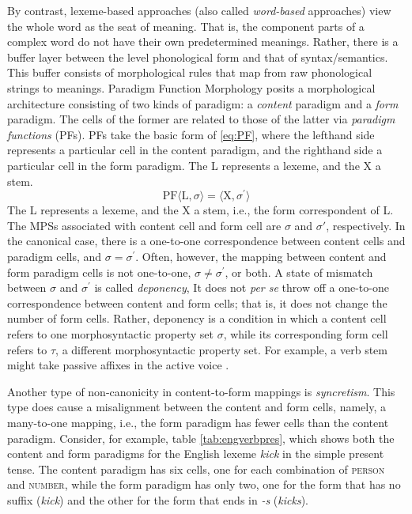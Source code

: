 By contrast, lexeme-based approaches (also called \emph{word-based} 
approaches) view the whole word as the seat of meaning. That is, the component 
parts of a complex word do not have their own predetermined meanings. 
Rather, 
there is a buffer layer between the level phonological form and that of 
syntax/semantics. This
buffer consists of morphological rules that map from raw phonological 
strings to meanings.
Paradigm Function Morphology \cite{stump:2001} 
posits a morphological architecture consisting of two kinds of paradigm: a \emph{content} paradigm and a \emph{form} paradigm.
The cells of the former are related to those of the latter via
\emph{paradigm functions} (PFs).
PFs take the basic form of
\eqref{eq:PF}, where the lefthand side represents a particular cell in the content paradigm, and the righthand side a particular cell in the form paradigm. The L represents a lexeme, and the X a stem. 
\begin{equation}
\label{eq:PF}
	\text{PF}\langle \text{L},\sigma \rangle = \langle \text{X}, \sigma^\prime \rangle
\end{equation}
The L represents a lexeme, and the X a stem,  i.e., the form correspondent of L. 
The \ac{MPS}s associated with content cell and form cell are $\sigma$ and 
$\sigma\prime$, respectively. In the canonical case, there is a one-to-one
correspondence between content cells and paradigm cells, and 
$\sigma = \sigma^\prime$.
Often, however, the mapping between content and form paradigm cells is not one-to-one, 
$\sigma \ne \sigma^\prime$, or both.
A state of mismatch between $\sigma$ and 
$\sigma^\prime$ is called \emph{deponency}, 
It does not \emph{per se} throw off a one-to-one 
correspondence between content 
and form cells; that is, it does not change the number of form cells. 
Rather, deponency is a condition in which a content cell refers to one
morphosyntactic property 
set $\sigma$, while its corresponding form cell refers to $\tau$, a different 
morphosyntactic property set.
For example, a verb stem might take passive affixes in the active voice \citep{stewart-and-stump:2007}.

Another type of non-canonicity in content-to-form mappings is \emph{syncretism}. 
This type does cause a misalignment between the content and form cells, namely,
a many-to-one mapping, i.e., the form paradigm has fewer cells 
than the content paradigm. Consider, for example, table 
\ref{tab:engverbpres}, which shows both the content and form paradigms 
for the English lexeme \emph{kick} in the simple present tense.
The content paradigm has six cells, one for each combination of \textsc{person} 
and \textsc{number}, while the form paradigm has only two, one for the 
form that has no suffix (\textit{kick}) and the other for the form 
that ends in \textit{-s} (\textit{kicks}). 
 
